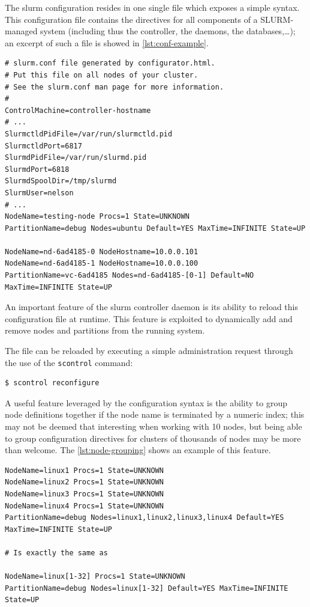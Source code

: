 The \gls{slurm} configuration resides in one single file which exposes a simple syntax. This configuration file contains the directives for all components of a SLURM-managed system (including thus the controller, the daemons, the databases,…); an excerpt of such a file is showed in \autoref{lst:conf-example}.

\lstset{language=bash,caption=SLURM configuration excerpt,label=lst:conf-example}
\begin{lstlisting}
# slurm.conf file generated by configurator.html.
# Put this file on all nodes of your cluster.
# See the slurm.conf man page for more information.
#
ControlMachine=controller-hostname
# ...
SlurmctldPidFile=/var/run/slurmctld.pid
SlurmctldPort=6817
SlurmdPidFile=/var/run/slurmd.pid
SlurmdPort=6818
SlurmdSpoolDir=/tmp/slurmd
SlurmUser=nelson
# ...
NodeName=testing-node Procs=1 State=UNKNOWN
PartitionName=debug Nodes=ubuntu Default=YES MaxTime=INFINITE State=UP

NodeName=nd-6ad4185-0 NodeHostname=10.0.0.101
NodeName=nd-6ad4185-1 NodeHostname=10.0.0.100
PartitionName=vc-6ad4185 Nodes=nd-6ad4185-[0-1] Default=NO MaxTime=INFINITE State=UP
\end{lstlisting}

An important feature of the \gls{slurm} controller daemon is its ability to reload this configuration file at runtime. This feature is exploited to dynamically add and remove nodes and partitions from the running system.

The file can be reloaded by executing a simple administration request through the use of the \texttt{scontrol} command:

\lstset{language=bash,caption=SLURM reconfiguration command,label=lst:reconfig}
\begin{lstlisting}
$ scontrol reconfigure
\end{lstlisting}

A useful feature leveraged by the configuration syntax is the ability to group node definitions together if the node name is terminated by a numeric index; this may not be deemed that interesting when working with 10 nodes, but being able to group configuration directives for clusters of thousands of nodes may be more than welcome. The \autoref{lst:node-grouping} shows an example of this feature.

\lstset{language=bash,caption=SLURM node naming and grouping example,label=lst:node-grouping}
\begin{lstlisting}
NodeName=linux1 Procs=1 State=UNKNOWN
NodeName=linux2 Procs=1 State=UNKNOWN
NodeName=linux3 Procs=1 State=UNKNOWN
NodeName=linux4 Procs=1 State=UNKNOWN
PartitionName=debug Nodes=linux1,linux2,linux3,linux4 Default=YES MaxTime=INFINITE State=UP

# Is exactly the same as

NodeName=linux[1-32] Procs=1 State=UNKNOWN
PartitionName=debug Nodes=linux[1-32] Default=YES MaxTime=INFINITE State=UP
\end{lstlisting}

